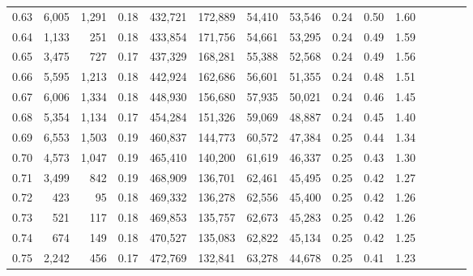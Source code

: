 \begin{tabular}{rrrcrrrrrrrrrrr}
0.63 &   6,005 &   1,291 &                                       0.18 &  432,721 &  172,889 &   54,410 &   53,546 &  0.24 &  0.50 &                         1.60 \\
0.64 &   1,133 &     251 &                                       0.18 &  433,854 &  171,756 &   54,661 &   53,295 &  0.24 &  0.49 &                         1.59 \\
0.65 &   3,475 &     727 &                                       0.17 &  437,329 &  168,281 &   55,388 &   52,568 &  0.24 &  0.49 &                         1.56 \\
0.66 &   5,595 &   1,213 &                                       0.18 &  442,924 &  162,686 &   56,601 &   51,355 &  0.24 &  0.48 &                         1.51 \\
0.67 &   6,006 &   1,334 &                                       0.18 &  448,930 &  156,680 &   57,935 &   50,021 &  0.24 &  0.46 &                         1.45 \\
0.68 &   5,354 &   1,134 &                                       0.17 &  454,284 &  151,326 &   59,069 &   48,887 &  0.24 &  0.45 &                         1.40 \\
0.69 &   6,553 &   1,503 &                                       0.19 &  460,837 &  144,773 &   60,572 &   47,384 &  0.25 &  0.44 &                         1.34 \\
0.70 &   4,573 &   1,047 &                                       0.19 &  465,410 &  140,200 &   61,619 &   46,337 &  0.25 &  0.43 &                         1.30 \\
0.71 &   3,499 &     842 &                                       0.19 &  468,909 &  136,701 &   62,461 &   45,495 &  0.25 &  0.42 &                         1.27 \\
0.72 &     423 &      95 &                                       0.18 &  469,332 &  136,278 &   62,556 &   45,400 &  0.25 &  0.42 &                         1.26 \\
0.73 &     521 &     117 &                                       0.18 &  469,853 &  135,757 &   62,673 &   45,283 &  0.25 &  0.42 &                         1.26 \\
0.74 &     674 &     149 &                                       0.18 &  470,527 &  135,083 &   62,822 &   45,134 &  0.25 &  0.42 &                         1.25 \\
0.75 &   2,242 &     456 &                                       0.17 &  472,769 &  132,841 &   63,278 &   44,678 &  0.25 &  0.41 &                         1.23 \\

\end{tabular}
